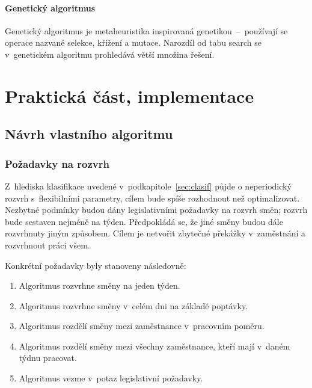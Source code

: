 \documentclass[twoside]{ctuthesis}
\begin{document}
\subsection{Genetický algoritmus}

Genetický algoritmus je metaheuristika inspirovaná genetikou~--~používají se operace nazvané selekce, křížení a mutace. Narozdíl od tabu search se v~genetickém algoritmu prohledává větší množina řešení.




\part{Praktická část, implementace}

\chapter{Návrh vlastního algoritmu}

\section{Požadavky na rozvrh}

Z~hlediska klasifikace uvedené v~podkapitole~\ref{sec:clasif} půjde o neperiodický rozvrh s~flexibilními parametry, cílem bude spíše rozhodnout než optimalizovat. Nezbytné podmínky budou dány legislativními požadavky na rozvrh směn; rozvrh bude sestaven nejméně na týden. Předpokládá se, že jiné směny budou dále rozvrhnuty jiným způsobem. Cílem je netvořit zbytečné překážky v~zaměstnání a rozvrhnout práci všem.

Konkrétní požadavky byly stanoveny následovně:
\begin{enumerate}
	\item Algoritmus rozvrhne směny na jeden týden.
	\item Algoritmus rozvrhne směny v~celém dni na základě poptávky.
	\item Algoritmus rozdělí směny mezi zaměstnance v~pracovním poměru.
	\item Algoritmus rozdělí směny mezi všechny zaměstnance, kteří mají v~daném týdnu pracovat.
	\item Algoritmus vezme v~potaz legislativní požadavky.
\end{enumerate}
\end{document}
